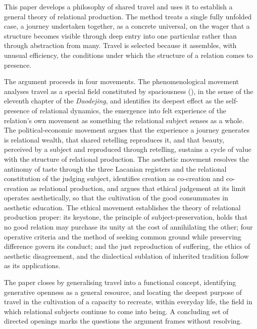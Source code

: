 This paper develops a philosophy of shared travel and uses it to establish a general theory of relational production. The method treats a single fully unfolded case, a journey undertaken together, as a concrete universal, on the wager that a structure becomes visible through deep entry into one particular rather than through abstraction from many. Travel is selected because it assembles, with unusual efficiency, the conditions under which the structure of a relation comes to presence.

The argument proceeds in four movements. The phenomenological movement analyses travel as a special field constituted by spaciousness (), in the sense of the eleventh chapter of the \emph{Daodejing}, and identifies its deepest effect as the self-presence of relational dynamics, the emergence into felt experience of the relation's own movement as something the relational subject senses as a whole. The political-economic movement argues that the experience a journey generates is relational wealth, that shared retelling reproduces it, and that beauty, perceived by a subject and reproduced through retelling, sustains a cycle of value with the structure of relational production. The aesthetic movement resolves the antinomy of taste through the three Lacanian registers and the relational constitution of the judging subject, identifies creation as co-creation and co-creation as relational production, and argues that ethical judgement at its limit operates aesthetically, so that the cultivation of the good consummates in aesthetic education. The ethical movement establishes the theory of relational production proper: its keystone, the principle of subject-preservation, holds that no good relation may purchase its unity at the cost of annihilating the other; four operative criteria and the method of seeking common ground while preserving difference govern its conduct; and the just reproduction of suffering, the ethics of aesthetic disagreement, and the dialectical sublation of inherited tradition follow as its applications.

The paper closes by generalising travel into a functional concept, identifying generative openness as a general resource, and locating the deepest purpose of travel in the cultivation of a capacity to recreate, within everyday life, the field in which relational subjects continue to come into being. A concluding set of directed openings marks the questions the argument frames without resolving.
